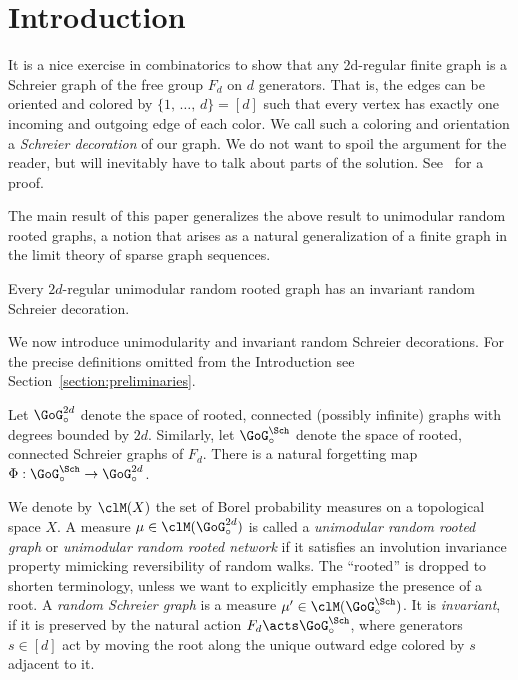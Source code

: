\section{Introduction} \label{section:intro}

It is a nice exercise in combinatorics to show that any 2d-regular finite graph is a Schreier graph of the free group $F_d$ on $d$ generators. That is, the edges can be oriented and colored by $\{1,\,\ldots,\,d\}=[d]$ such that every vertex has exactly one incoming and outgoing edge of each color. We call such a coloring and orientation a \emph{Schreier decoration} of our graph. We do not want to spoil the argument for the reader, but will inevitably have to talk about parts of the solution. See~\cite{cannizzo2013invariant} for a proof.

The main result of this paper generalizes the above result to unimodular random rooted graphs, a notion that arises as a natural generalization of a finite graph in the limit theory of sparse graph sequences.

\begin{theo}\label{theorem:main}
Every $2d$-regular unimodular random rooted graph has an invariant random Schreier decoration.
\end{theo}
We now introduce unimodularity and invariant random Schreier decorations. For the precise definitions omitted from the Introduction see Section~\ref{section:preliminaries}.

Let $\GoG_{\circ}^{2d}$ denote the space of rooted, connected (possibly infinite) graphs with degrees bounded by $2d$. Similarly, let $\GoG_{\circ}^{\Sch}$ denote the space of rooted, connected Schreier graphs of $F_d$. There is a natural forgetting map $\Phi: \GoG_{\circ}^{\Sch} \to \GoG_{\circ}^{2d}$.

We denote by $\clM(X)$ the set of Borel probability measures on a topological space $X$. A measure $\mu \in \clM(\GoG_{\circ}^{2d})$ is called a \emph{unimodular random rooted graph} or \emph{unimodular random rooted network} if it satisfies an involution invariance property mimicking reversibility of random walks. The ``rooted'' is dropped to shorten terminology, unless we want to explicitly emphasize the presence of a root. A \emph{random Schreier graph} is a measure $\mu' \in \clM(\GoG_{\circ}^{\Sch})$. It is \emph{invariant}, if it is preserved by the natural action $F_d \acts \GoG_{\circ}^{\Sch}$, where generators $s \in [d]$ act by moving the root along the unique outward edge colored by $s$ adjacent to it.

